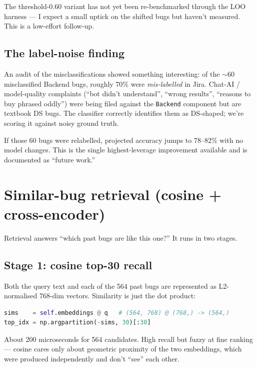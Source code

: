 \documentclass[11pt,a4paper]{article}
\begin{document}
The threshold-0.60 variant has not yet been re-benchmarked through the LOO
harness --- I expect a small uptick on the shifted bugs but haven't
measured. This is a low-effort follow-up.

\subsection{The label-noise finding}

An audit of the misclassifications showed something interesting: of the
$\sim$60 misclassified Backend bugs, roughly 70\% were \emph{mis-labelled}
in Jira. Chat-AI / model-quality complaints (``bot didn't understand'',
``wrong results'', ``reasons to buy phrased oddly'') were being filed
against the \texttt{Backend} component but are textbook DS bugs. The
classifier correctly identifies them as DS-shaped; we're scoring it against
noisy ground truth.

If those 60 bugs were relabelled, projected accuracy jumps to 78--82\% with
no model changes. This is the single highest-leverage improvement
available and is documented as ``future work.''

\newpage

\section{Similar-bug retrieval (cosine + cross-encoder)}

Retrieval answers ``which past bugs are like this one?'' It runs in two
stages.

\subsection{Stage 1: cosine top-30 recall}

Both the query text and each of the 564 past bugs are represented as
L2-normalised 768-dim vectors. Similarity is just the dot product:

\begin{lstlisting}[language=python]
sims    = self.embeddings @ q   # (564, 768) @ (768,) -> (564,)
top_idx = np.argpartition(-sims, 30)[:30]
\end{lstlisting}

About 200 microseconds for 564 candidates. High recall but fuzzy at fine
ranking --- cosine cares only about geometric proximity of the two
embeddings, which were produced independently and don't ``see'' each
other.
\end{document}
